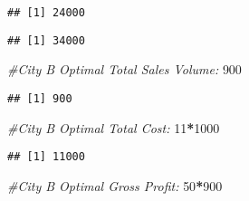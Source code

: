\documentclass[]{article}
\newenvironment{Shaded}{\begin{snugshade}}{\end{snugshade}}
\newcommand{\CommentTok}[1]{\textcolor[rgb]{0.56,0.35,0.01}{\textit{#1}}}
\newcommand{\DecValTok}[1]{\textcolor[rgb]{0.00,0.00,0.81}{#1}}
\newcommand{\KeywordTok}[1]{\textcolor[rgb]{0.13,0.29,0.53}{\textbf{#1}}}
\newcommand{\NormalTok}[1]{#1}
\newcommand{\OperatorTok}[1]{\textcolor[rgb]{0.81,0.36,0.00}{\textbf{#1}}}
\newcommand{\StringTok}[1]{\textcolor[rgb]{0.31,0.60,0.02}{#1}}
\begin{document}
\begin{verbatim}
## [1] 24000
\end{verbatim}

\begin{Shaded}
\end{Shaded}

\begin{verbatim}
## [1] 34000
\end{verbatim}

\begin{Shaded}
\begin{Highlighting}[]
\CommentTok{#City B Optimal Total Sales Volume:}
\DecValTok{900}
\end{Highlighting}
\end{Shaded}

\begin{verbatim}
## [1] 900
\end{verbatim}

\begin{Shaded}
\begin{Highlighting}[]
\CommentTok{#City B Optimal Total Cost:}
\DecValTok{11}\OperatorTok{*}\DecValTok{1000}
\end{Highlighting}
\end{Shaded}

\begin{verbatim}
## [1] 11000
\end{verbatim}

\begin{Shaded}
\begin{Highlighting}[]
\CommentTok{#City B Optimal Gross Profit:}
\DecValTok{50}\OperatorTok{*}\DecValTok{900}
\end{Highlighting}
\end{Shaded}
\end{document}
